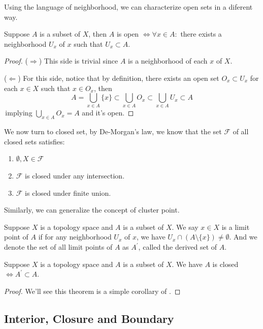 Using the language of neighborhood, we can characterize open sets in a diferent way.
\begin{theorem} 
    Suppose $A$ is a subset of $X$, then $A$ is open $\iff \forall x\in A:$ there exists a neighborhood $U_x$ of $x$ such that $U_x \subset A$.
\end{theorem}
\begin{proof}
    ($\Rightarrow$) This side is trivial since $A$ is a neighborhood of each $x$ of $X$.

    ($\Leftarrow$) For this side, notice that by definition, there exists an open set $O_x \subset U_x$ for each $x\in X$ such that $x\in O_x$, then 
    $$A=\bigcup_{x\in A} \{x\} \subset \bigcup_{x\in A} O_x \subset \bigcup_{x\in A} U_x \subset A$$
    \,implying $\bigcup_{x\in A} O_x = A$ and it's open.
\end{proof}


We now turn to closed set, by De-Morgan's law, we know that the set $\mathcal{F}$ of all closed sets satisfies:
\begin{enumerate}
    \item $\emptyset,X \in\mathcal{F} $
    \item $\mathcal{F}$ is closed under any intersection.
    \item $\mathcal{F}$ is closed under finite union.
\end{enumerate}

Similarly, we can generalize the concept of cluster point.
\begin{definition}
    Suppose $X$ is a topology space and $A$ is a subset of $X$. We say $x \in X$ is a limit point of $A$ if for any neighborhood $U_x$ of $x$,
    we have $U_x \cap (A\setminus \{x\}) \neq \emptyset$. And we denote the set of all limit points of $A$ as $A^{\prime}$, called the derived set of $A$.
\end{definition}

\begin{theorem}
    Suppose $X$ is a topology space and $A$ is a subset of $X$. We have $A$ is closed $\iff A^{\prime} \subset A$.
\end{theorem}
\begin{proof}
    We'll see this theorem is a simple corollary of .
\end{proof}

\subsection{Interior, Closure and Boundary}

